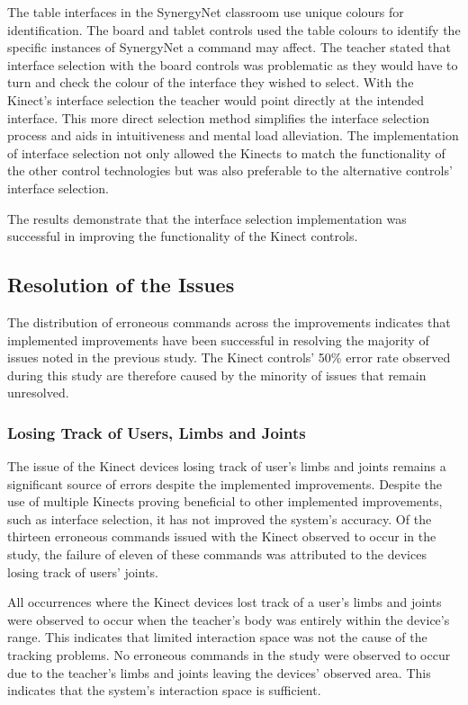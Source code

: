 \documentclass[link]{IWCOMP}
\begin{document}
The table interfaces in the SynergyNet classroom use unique colours for identification.
The board and tablet controls used the table colours to identify the specific instances of SynergyNet a command may affect.
The teacher stated that interface selection with the board controls was problematic as they would have to turn and check the colour of the interface they wished to select.
With the Kinect's interface selection the teacher would point directly at the intended interface.
This more direct selection method simplifies the interface selection process and aids in intuitiveness and mental load alleviation.
The implementation of interface selection not only allowed the Kinects to match the functionality of the other control technologies but was also preferable to the alternative controls' interface selection.

The results demonstrate that the interface selection implementation was successful in improving the functionality of the Kinect controls.

\subsection{Resolution of the Issues}
\label{sec:discussionResolution}

The distribution of erroneous commands across the improvements indicates that implemented improvements have been successful in resolving the majority of issues noted in the previous study.
The Kinect controls' 50\% error rate observed during this study are therefore caused by the minority of issues that remain unresolved.

\subsubsection{Losing Track of Users, Limbs and Joints}
\label{sec:discussionResolutionLosingTrack}

The issue of the Kinect devices losing track of user's limbs and joints remains a significant source of errors despite the implemented improvements.
Despite the use of multiple Kinects proving beneficial to other implemented improvements, such as interface selection, it has not improved the system's accuracy.
Of the thirteen erroneous commands issued with the Kinect observed to occur in the study, the failure of eleven of these commands was attributed to the devices losing track of users' joints.

All occurrences where the Kinect devices lost track of a user's limbs and joints were observed to occur when the teacher's body was entirely within the device's range.
This indicates that limited interaction space was not the cause of the tracking problems.
No erroneous commands in the study were observed to occur due to the teacher's limbs and joints leaving the devices' observed area.
This indicates that the system's interaction space is sufficient.
\end{document}
